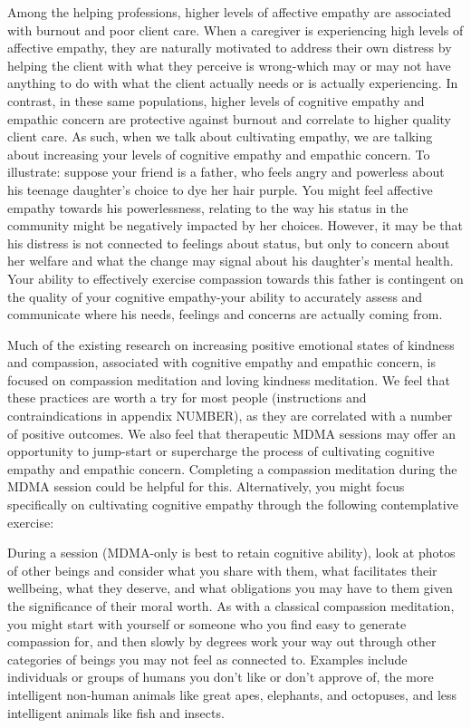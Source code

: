 \documentclass[12pt,letterpaper]{article}
\begin{document}
Among the helping professions, higher levels of affective empathy are associated with burnout and poor client care. When a caregiver is experiencing high levels of affective empathy, they are naturally motivated to address their own distress by helping the client with what they perceive is wrong-which may or may not have anything to do with what the client actually needs or is actually experiencing. In contrast, in these same populations, higher levels of cognitive empathy and empathic concern are protective against burnout and correlate to higher quality client care. As such, when we talk about cultivating empathy, we are talking about increasing your levels of cognitive empathy and empathic concern. To illustrate: suppose your friend is a father, who feels angry and powerless about his teenage daughter's choice to dye her hair purple. You might feel affective empathy towards his powerlessness, relating to the way his status in the community might be negatively impacted by her choices. However, it may be that his distress is not connected to feelings about status, but only to concern about her welfare and what the change may signal about his daughter's mental health. Your ability to effectively exercise compassion towards this father is contingent on the quality of your cognitive empathy-your ability to accurately assess and communicate where his needs, feelings and concerns are actually coming from.

Much of the existing research on increasing positive emotional states of kindness and compassion, associated with cognitive empathy and empathic concern, is focused on compassion meditation and loving kindness meditation. We feel that these practices are worth a try for most people (instructions and contraindications in appendix NUMBER), as they are correlated with a number of positive outcomes. We also feel that therapeutic MDMA sessions may offer an opportunity to jump-start or supercharge the process of cultivating cognitive empathy and empathic concern. Completing a compassion meditation during the MDMA session could be helpful for this. Alternatively, you might focus specifically on cultivating cognitive empathy through the following contemplative exercise:

During a session (MDMA-only is best to retain cognitive ability), look at photos of other beings and consider what you share with them, what facilitates their wellbeing, what they deserve, and what obligations you may have to them given the significance of their moral worth. As with a classical compassion meditation, you might start with yourself or someone who you find easy to generate compassion for, and then slowly by degrees work your way out through other categories of beings you may not feel as connected to. Examples include individuals or groups of humans you don't like or don't approve of, the more intelligent non-human animals like great apes, elephants, and octopuses, and less intelligent animals like fish and insects.
\end{document}
